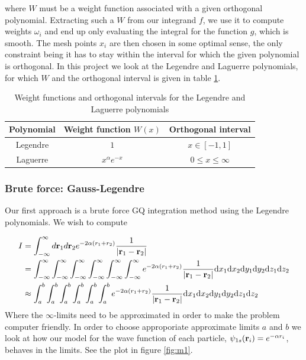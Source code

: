 \documentclass[norsk,a4paper,11pt]{article}
\begin{document}
where $W$ must be a weight function associated with a given orthogonal polynomial. Extracting such a $W$ from
our integrand $f$, we use it to compute weights
$\omega_i$ and end up only evaluating the integral for the function $g$, which is smooth.
The mesh points $x_i$ are then chosen in some optimal sense, the only constraint being it has to stay within the interval 
for which the given polynomial is orthogonal. In this project we look at the Legendre and Laguerre polynomials, for which $W$ and
the orthogonal interval is given in table \ref{tab:m1}.

\begin{table}
  \begin{center}
  \caption{
      \label{tab:m1}
  Weight functions and orthogonal intervals for the Legendre and Laguerre polynomials}
  \begin{tabular}{|c|c|c|} \hline
      \textbf{Polynomial} & \textbf{Weight function $W(x)$} & \textbf{Orthogonal interval} \\ \hline
      Legendre  &  $1$ & $x \in [-1, 1]$\\
      Laguerre & $x^\alpha e^{-x}$ & $0 \leq x \leq \infty $  \\ \hline
  \end{tabular}
  \end{center}
\end{table}


\subsubsection{Brute force: Gauss-Legendre}
Our first approach is a brute force GQ integration method using the Legendre polynomials. We wish to compute

\begin{align*}
     I & = 
    \int_{-\infty}^{\infty} d{\bf r}_1d{\bf r}_2 e^{-2\alpha (r_1+r_2)}\frac{1}{|{\bf r}_1-{\bf r}_2|} \\
    & = \int_{-\infty}^{\infty} \int_{-\infty}^{\infty} \int_{-\infty}^{\infty} \int_{-\infty}^{\infty} \int_{-\infty}^{\infty} \int_{-\infty}^{\infty}
      e^{-2\alpha (r_1+r_2)}\frac{1}{|{\bf r}_1-{\bf r}_2|}
     \mathrm{d}x_1 \mathrm{d}x_2 \mathrm{d}y_1 \mathrm{d}y_2 \mathrm{d}z_1 \mathrm{d}z_2 \\
    & \approx
    \int_{a}^{b} \int_{a}^{b} \int_{a}^{b} \int_{a}^{b} \int_{a}^{b} \int_{a}^{b}
      e^{-2\alpha (r_1+r_2)}\frac{1}{|{\bf r}_1-{\bf r}_2|}
     \mathrm{d}x_1 \mathrm{d}x_2 \mathrm{d}y_1 \mathrm{d}y_2 \mathrm{d}z_1 \mathrm{d}z_2
\end{align*}
Where the $\infty$-limits need to be approximated in order to make the problem computer friendly. In order to choose approporiate 
approximate limits $a$ and $b$ we look at how our model for the wave function of each particle,
$\psi_{1s}({\bf r}_i) = e^{-\alpha r_i}$, behaves in the limits. See the plot in figure \ref{fig:m1}.
\end{document}
